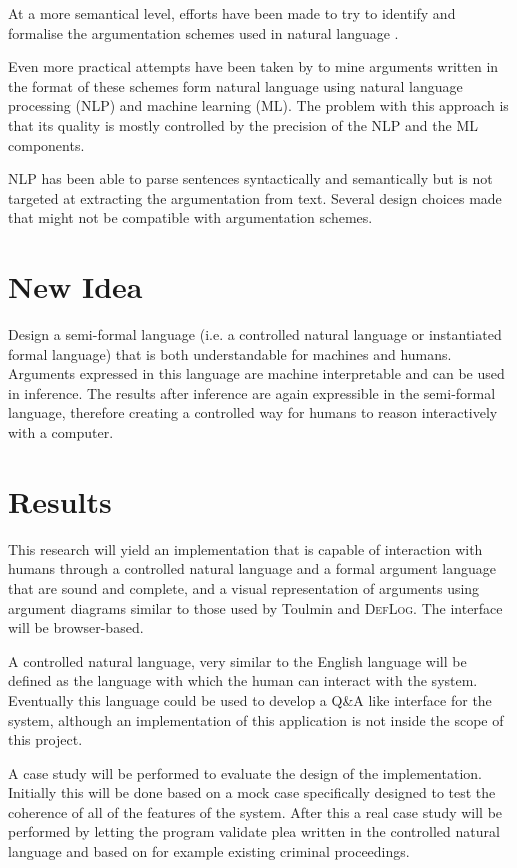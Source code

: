 \documentclass[a4paper]{article}
\begin{document}
At a more semantical level, efforts have been made to try to identify and formalise the argumentation schemes used in natural language \citep{Walton:2013argumentation}.

Even more practical attempts have been taken by \citet{Mochales:2011eg} to mine arguments written in the format of these schemes form natural language using natural language processing (NLP) and machine learning (ML). The problem with this approach is that its quality is mostly controlled by the precision of the NLP and the ML components.

NLP has been able to parse sentences syntactically and semantically \citep{Curran:2007vq} but is not targeted at extracting the argumentation from text. Several design choices made that might not be compatible with argumentation schemes.

\section*{New Idea}
Design a semi-formal language (i.e. a controlled natural language or instantiated formal language) that is both understandable for machines and humans. Arguments expressed in this language are machine interpretable and can be used in inference. The results after inference are again expressible in the semi-formal language, therefore creating a controlled way for humans to reason interactively with a computer.

\section*{Results}
This research will yield an implementation that is capable of interaction with humans through a controlled natural language and a formal argument language that are sound and complete, and a visual representation of arguments using argument diagrams similar to those used by Toulmin and \textsc{DefLog}. The interface will be browser-based.

A controlled natural language, very similar to the English language will be defined as the language with which the human can interact with the system. Eventually this language could be used to develop a Q\&A like interface for the system, although an implementation of this application is not inside the scope of this project.

A case study will be performed to evaluate the design of the implementation. Initially this will be done based on a mock case specifically designed to test the coherence of all of the features of the system. After this a real case study will be performed by letting the program validate plea written in the controlled natural language and based on for example existing criminal proceedings.
\end{document}
